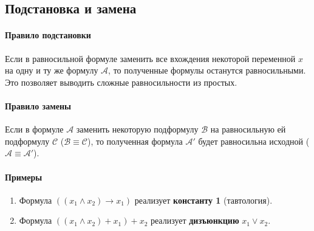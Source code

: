 \subsection*{Подстановка и замена}

\paragraph{Правило подстановки}
Если в равносильной формуле заменить все вхождения некоторой переменной $x$ на одну и ту же формулу $\mathcal{A}$, то полученные формулы останутся равносильными. Это позволяет выводить сложные равносильности из простых.

\paragraph{Правило замены}
Если в формуле $\mathcal{A}$ заменить некоторую подформулу $\mathcal{B}$ на равносильную ей подформулу $\mathcal{C}$ ($\mathcal{B} \equiv \mathcal{C}$), то полученная формула $\mathcal{A}'$ будет равносильна исходной ($\mathcal{A} \equiv \mathcal{A}'$).

\paragraph{Примеры}
\begin{enumerate}
    \item Формула $((x_1 \land x_2) \to x_1)$ реализует \textbf{константу 1} (тавтология).
    \item Формула $((x_1 \land x_2) + x_1) + x_2$ реализует \textbf{дизъюнкцию} $x_1 \lor x_2$.
\end{enumerate}